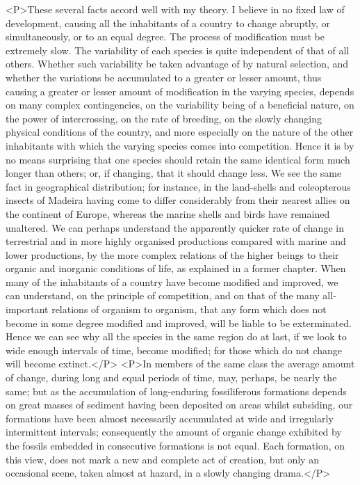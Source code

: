 <P>These several facts accord well with my theory. I believe in no fixed law of development, causing all the inhabitants of a country to change abruptly, or simultaneously, or to an equal degree. The process of modification must be extremely slow. The variability of each species is quite independent of that of all others.  Whether such variability be taken advantage of by natural selection, and whether the variations be accumulated to a greater or lesser amount, thus causing a greater or lesser amount of modification in the varying species, depends on many complex contingencies, on the variability being of a beneficial nature, on the power of intercrossing, on the rate of breeding, on the slowly changing physical conditions of the country, and more especially on the nature of the other inhabitants with which the varying species comes into competition. Hence it is by no means surprising that one species should retain the same identical form much longer than others; or, if changing, that it should change less. We see the same fact in geographical distribution; for instance, in the land-shells and coleopterous insects of Madeira having come to differ considerably from their nearest allies on the continent of Europe, whereas the marine shells and birds have remained unaltered. We can perhaps understand the apparently quicker rate of change in terrestrial and in more highly organised productions compared with marine and lower productions, by the more complex relations of the higher beings to their organic and inorganic conditions of life, as explained in a former chapter. When many of the inhabitants of a country have become modified and improved, we can understand, on the principle of competition, and on that of the many all-important relations of organism to organism, that any form which does not become in some degree modified and improved, will be liable to be exterminated. Hence we can see why all the species in the same region do at last, if we look to wide enough intervals of time, become modified; for those which do not change will become extinct.</P>
<P>In members of the same class the average amount of change, during long and equal periods of time, may, perhaps, be nearly the same; but as the accumulation of long-enduring fossiliferous formations depends on great masses of sediment having been deposited on areas whilst subsiding, our formations have been almost necessarily accumulated at wide and irregularly intermittent intervals; consequently the amount of organic change exhibited by the fossils embedded in consecutive formations is not equal. Each formation, on this view, does not mark a new and complete act of creation, but only an occasional scene, taken almost at hazard, in a slowly changing drama.</P>
